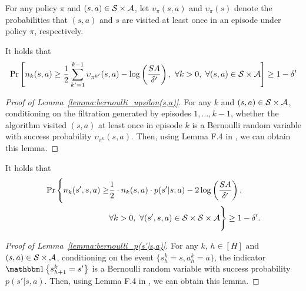 For any policy $\pi$ and $(s,a)\in \mathcal{S} \times \mathcal{A}$, let $\upsilon_{\pi}(s,a)$ and $\upsilon_{\pi}(s)$ denote the probabilities that $(s,a)$ and $s$ are visited at least once in an episode under policy $\pi$, respectively. 

\begin{lemma} \label{lemma:bernoulli_upsilon(s,a)}
	It holds that
	\begin{align*}
		\Pr \left[ n_k(s,a) \geq \frac{1}{2} \sum_{k'=1}^{k-1} \upsilon_{\pi^{k'}}(s,a) - \log \left( \frac{SA}{\delta'} \right), \ \forall k>0,\ \forall (s,a) \in \mathcal{S} \times \mathcal{A} \right] \geq 1-\delta'
	\end{align*}
\end{lemma}
\begin{proof}[Proof of Lemma~\ref{lemma:bernoulli_upsilon(s,a)}]
	For any $k$ and $(s,a) \in \mathcal{S} \times \mathcal{A}$, conditioning on the filtration generated by episodes $1,\dots,k-1$, whether the algorithm visited $(s,a)$ at least once in episode $k$ is a Bernoulli random variable with success probability $\upsilon_{\pi^k}(s,a)$.
	Then, using Lemma F.4 in \citep{dann2017unifying}, we can obtain this lemma.
\end{proof}

%

\begin{lemma} \label{lemma:bernoulli_p(s'|s,a)}
	It holds that
	\begin{align*}
		\Pr \Bigg\{ n_k(s',s,a) \geq & \frac{1}{2} \cdot n_k(s,a) \cdot p(s'|s,a) - 2 \log \left( \frac{SA}{\delta'} \right), 
		\\ & \forall k>0,\ \forall (s',s,a) \in \mathcal{S} \times \mathcal{S} \times \mathcal{A} \Bigg\} \geq 1-\delta' .
	\end{align*}
\end{lemma}
\begin{proof}[Proof of Lemma~\ref{lemma:bernoulli_p(s'|s,a)}]
	For any $k$, $h \in [H]$ and $(s,a) \in \mathcal{S} \times \mathcal{A}$, conditioning on the event $\{s^k_h=s,a^k_h=a\}$, the indicator $\indicator{s^k_{h+1}=s'}$ is a Bernoulli random variable with success probability $p(s'|s,a)$.
	Then, using Lemma F.4 in \citep{dann2017unifying}, we can obtain this lemma.
\end{proof}

